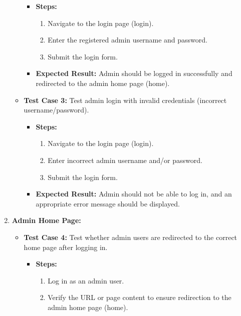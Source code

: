 \begin{enumerate}
\begin{itemize}
        \begin{itemize}
            \item \textbf{Steps:}
            \begin{enumerate}
                \item Navigate to the login page (login).
                \item Enter the registered admin username and password.
                \item Submit the login form.
            \end{enumerate}
            \item \textbf{Expected Result:} Admin should be logged in successfully and redirected to the admin home page (home).
        \end{itemize}
        \item \textbf{Test Case 3:} Test admin login with invalid credentials (incorrect username/password).
        \begin{itemize}
            \item \textbf{Steps:}
            \begin{enumerate}
                \item Navigate to the login page (login).
                \item Enter incorrect admin username and/or password.
                \item Submit the login form.
            \end{enumerate}
            \item \textbf{Expected Result:} Admin should not be able to log in, and an appropriate error message should be displayed.
        \end{itemize}
    \end{itemize}
    \item \textbf{Admin Home Page:}
    \begin{itemize}
        \item \textbf{Test Case 4:} Test whether admin users are redirected to the correct home page after logging in.
        \begin{itemize}
            \item \textbf{Steps:}
            \begin{enumerate}
                \item Log in as an admin user.
                \item Verify the URL or page content to ensure redirection to the admin home page (home).
            \end{enumerate}

\end{itemize}
\end{itemize}
\end{enumerate}
